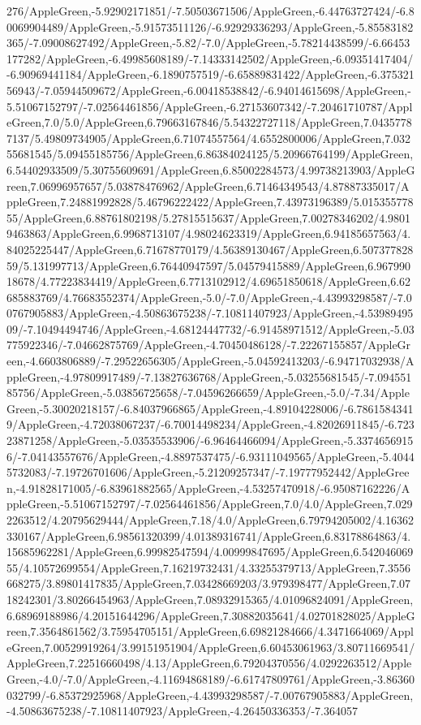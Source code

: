 {\begin{tikzternal}
276/AppleGreen,-5.92902171851/-7.50503671506/AppleGreen,-6.44763727424/-6.80069904489/AppleGreen,-5.91573511126/-6.92929336293/AppleGreen,-5.85583182365/-7.09008627492/AppleGreen,-5.82/-7.0/AppleGreen,-5.78214438599/-6.66453177282/AppleGreen,-6.49985608189/-7.14333142502/AppleGreen,-6.09351417404/-6.90969441184/AppleGreen,-6.1890757519/-6.65889831422/AppleGreen,-6.37532156943/-7.05944509672/AppleGreen,-6.00418538842/-6.94014615698/AppleGreen,-5.51067152797/-7.02564461856/AppleGreen,-6.27153607342/-7.20461710787/AppleGreen,7.0/5.0/AppleGreen,6.79663167846/5.54322727118/AppleGreen,7.04357787137/5.49809734905/AppleGreen,6.71074557564/4.6552800006/AppleGreen,7.03255681545/5.09455185756/AppleGreen,6.86384024125/5.20966764199/AppleGreen,6.54402933509/5.30755609691/AppleGreen,6.85002284573/4.99738213903/AppleGreen,7.06996957657/5.03878476962/AppleGreen,6.71464349543/4.87887335017/AppleGreen,7.24881992828/5.46796222422/AppleGreen,7.43973196389/5.01535577855/AppleGreen,6.88761802198/5.27815515637/AppleGreen,7.00278346202/4.98019463863/AppleGreen,6.9968713107/4.98024623319/AppleGreen,6.94185657563/4.84025225447/AppleGreen,6.71678770179/4.56389130467/AppleGreen,6.50737782859/5.131997713/AppleGreen,6.76440947597/5.04579415889/AppleGreen,6.96799018678/4.77223834419/AppleGreen,6.7713102912/4.69651850618/AppleGreen,6.62685883769/4.76683552374/AppleGreen,-5.0/-7.0/AppleGreen,-4.43993298587/-7.00767905883/AppleGreen,-4.50863675238/-7.10811407923/AppleGreen,-4.5398949509/-7.10494494746/AppleGreen,-4.68124447732/-6.91458971512/AppleGreen,-5.03775922346/-7.04662875769/AppleGreen,-4.70450486128/-7.22267155857/AppleGreen,-4.6603806889/-7.29522656305/AppleGreen,-5.04592413203/-6.94717032938/AppleGreen,-4.97809917489/-7.13827636768/AppleGreen,-5.03255681545/-7.09455185756/AppleGreen,-5.03856725658/-7.04596266659/AppleGreen,-5.0/-7.34/AppleGreen,-5.30020218157/-6.84037966865/AppleGreen,-4.89104228006/-6.78615843419/AppleGreen,-4.72038067237/-6.70014498234/AppleGreen,-4.82026911845/-6.72323871258/AppleGreen,-5.03535533906/-6.96464466094/AppleGreen,-5.33746569156/-7.04143557676/AppleGreen,-4.8897537475/-6.93111049565/AppleGreen,-5.40445732083/-7.19726701606/AppleGreen,-5.21209257347/-7.19777952442/AppleGreen,-4.91828171005/-6.83961882565/AppleGreen,-4.53257470918/-6.95087162226/AppleGreen,-5.51067152797/-7.02564461856/AppleGreen,7.0/4.0/AppleGreen,7.0292263512/4.20795629444/AppleGreen,7.18/4.0/AppleGreen,6.79794205002/4.16362330167/AppleGreen,6.98561320399/4.01389316741/AppleGreen,6.83178864863/4.15685962281/AppleGreen,6.99982547594/4.00999847695/AppleGreen,6.54204606955/4.10572699554/AppleGreen,7.16219732431/4.33255379713/AppleGreen,7.3556668275/3.89801417835/AppleGreen,7.03428669203/3.979398477/AppleGreen,7.0718242301/3.80266454963/AppleGreen,7.08932915365/4.01096824091/AppleGreen,6.68969188986/4.20151644296/AppleGreen,7.30882035641/4.02701828025/AppleGreen,7.3564861562/3.75954705151/AppleGreen,6.69821284666/4.3471664069/AppleGreen,7.00529919264/3.99151951904/AppleGreen,6.60453061963/3.80711669541/AppleGreen,7.22516660498/4.13/AppleGreen,6.79204370556/4.0292263512/AppleGreen,-4.0/-7.0/AppleGreen,-4.11694868189/-6.61747809761/AppleGreen,-3.86360032799/-6.85372925968/AppleGreen,-4.43993298587/-7.00767905883/AppleGreen,-4.50863675238/-7.10811407923/AppleGreen,-4.26450336353/-7.364057
\end{tikzternal}}
